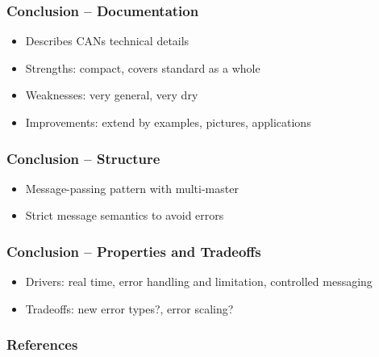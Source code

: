 \documentclass[xcolor=x11names,compress]{beamer}
\renewcommand{\(}{\begin{columns}}
\renewcommand{\)}{\end{columns}}
\newcommand{\<}[1]{\begin{column}{#1}}
\renewcommand{\>}{\end{column}}
\begin{document}
\begin{frame}
  \frametitle{Conclusion -- Documentation}

\begin{itemize}
 \item Describes CANs technical details
 \item Strengths: compact, covers standard as a whole
 \item Weaknesses: very general, very dry
 \item Improvements: extend by examples, pictures, applications 

\end{itemize}

\end{frame}

\begin{frame}
  \frametitle{Conclusion -- Structure}

\begin{itemize}
 \item Message-passing pattern with multi-master
 \item Strict message semantics to avoid errors

\end{itemize}

\end{frame}

\begin{frame}
  \frametitle{Conclusion -- Properties and Tradeoffs}
\begin{itemize}
 \item Drivers: real time, error handling and limitation, controlled messaging
 \item Tradeoffs: new error types?, error scaling?
\end{itemize}

\end{frame}

\begin{frame}
  \frametitle{References}
  \scriptsize
  
  
\end{frame}
\end{document}
